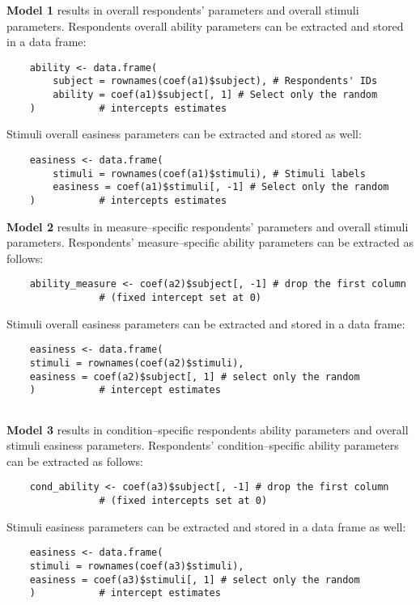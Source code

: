 \documentclass[12pt]{book}
\begin{document}
\textbf{Model 1} results in overall respondents' parameters and overall stimuli parameters. Respondents overall ability parameters can be extracted and stored in a data frame: 
%
\begin{lstlisting}
	ability <- data.frame(
		subject = rownames(coef(a1)$subject), # Respondents' IDs
		ability = coef(a1)$subject[, 1] # Select only the random
	)			# intercepts estimates
\end{lstlisting}

Stimuli overall easiness parameters can be extracted and stored as well: 
%
\begin{lstlisting}
	easiness <- data.frame(
		stimuli = rownames(coef(a1)$stimuli), # Stimuli labels
		easiness = coef(a1)$stimuli[, -1] # Select only the random 
	) 			# intercepts estimates	
\end{lstlisting}


\textbf{Model 2} results in measure--specific respondents' parameters and overall stimuli parameters. 
Respondents' measure--specific ability parameters can be extracted as follows: 
%
\begin{lstlisting}
	ability_measure <- coef(a2)$subject[, -1] # drop the first column 
				# (fixed intercept set at 0)
\end{lstlisting}

Stimuli overall easiness parameters can be extracted and stored in a data frame: 
%
\begin{lstlisting}
	easiness <- data.frame(
	stimuli = rownames(coef(a2)$stimuli),
	easiness = coef(a2)$subject[, 1] # select only the random 
	)			# intercept estimates
	
\end{lstlisting}

\textbf{Model 3} results in condition--specific respondents ability parameters and overall stimuli easiness parameters. 
Respondents' condition--specific ability parameters can be extracted as follows: 
%
\begin{lstlisting}
	cond_ability <- coef(a3)$subject[, -1] # drop the first column 
				# (fixed intercepts set at 0)
\end{lstlisting}

Stimuli easiness parameters can be extracted and stored in a data frame as well: 
%
\begin{lstlisting}
	easiness <- data.frame(
	stimuli = rownames(coef(a3)$stimuli),
	easiness = coef(a3)$stimuli[, 1] # select only the random
	)			# intercept estimates
	
\end{lstlisting}
\end{document}

